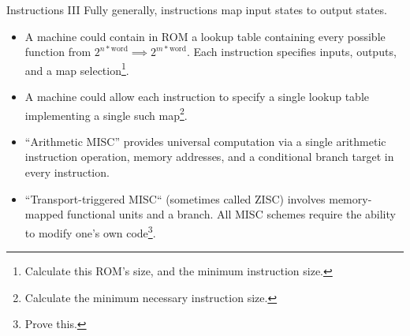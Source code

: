 \documentclass[mathserif,xcolor={dvipsnames,table}]{beamer}
\begin{document}
\begin{frame}{Instructions III}
Fully generally, instructions map input states to output states.
\small{
\begin{itemize}
\item A machine could contain in ROM a lookup table containing every possible
function from $2^{n*\text{word}}\implies 2^{m*\text{word}}$. Each instruction
specifies inputs, outputs, and a map selection\footnote{Calculate this ROM's size, and the minimum instruction size.}.
\item A machine could allow each instruction to specify a single lookup table implementing
a single such map\footnote{Calculate the minimum necessary instruction size.}.
\item ``Arithmetic MISC'' provides universal computation via a single arithmetic instruction
operation, memory addresses, and a conditional branch target in every instruction.
\item``Transport-triggered MISC`` (sometimes called ZISC) involves memory-mapped
functional units and a branch. All MISC schemes require the ability to modify one's
own code\footnote{Prove this.}.
\end{itemize}
}
\end{frame}
\end{document}
